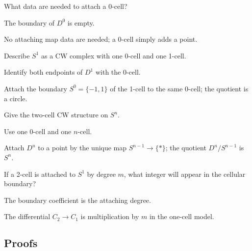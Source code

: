 \begin{exercise}\label{exr:viii05-ped-02}
What data are needed to attach a 0-cell?
\end{exercise}
\begin{hint}
The boundary of $D^0$ is empty.
\end{hint}
\begin{solution}
No attaching map data are needed; a 0-cell simply adds a point.
\end{solution}

\begin{exercise}\label{exr:viii05-ped-03}
Describe $S^1$ as a CW complex with one 0-cell and one 1-cell.
\end{exercise}
\begin{hint}
Identify both endpoints of $D^1$ with the 0-cell.
\end{hint}
\begin{solution}
Attach the boundary $S^0=\{-1,1\}$ of the 1-cell to the same 0-cell; the quotient is a circle.
\end{solution}

\begin{exercise}\label{exr:viii05-ped-04}
Give the two-cell CW structure on $S^n$.
\end{exercise}
\begin{hint}
Use one 0-cell and one $n$-cell.
\end{hint}
\begin{solution}
Attach $D^n$ to a point by the unique map $S^{n-1}\to\{*\}$; the quotient $D^n/S^{n-1}$ is $S^n$.
\end{solution}

\begin{exercise}\label{exr:viii05-ped-05}
If a 2-cell is attached to $S^1$ by degree $m$, what integer will appear in the cellular boundary?
\end{exercise}
\begin{hint}
The boundary coefficient is the attaching degree.
\end{hint}
\begin{solution}
The differential $C_2\to C_1$ is multiplication by $m$ in the one-cell model.
\end{solution}

\subsection*{Proofs}

